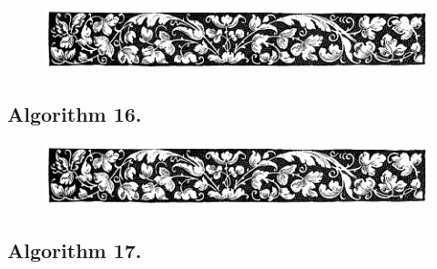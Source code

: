 \documentclass[preview]{standalone}
\begin{document}
\begin{figure}[!h]
    \centering
    \includegraphics[width=14cm]{../resources/jpg/3.1.algorithms/border2.jpg}
\end{figure}
\subsection[Partial sort.]{
    \color{section} Algorithm 16.
}

\vspace{1\baselineskip}
\begin{center}
    
\end{center}
\vspace{1\baselineskip}
\begin{center}
    
\end{center}


\begin{figure}[!h]
    \centering
    \includegraphics[width=14cm]{../resources/jpg/3.1.algorithms/border2.jpg}
\end{figure}
\subsection[Find the longest word.]{
    \color{section} Algorithm 17.
}

\vspace{1\baselineskip}
\begin{center}
    
\end{center}
\pagebreak
\begin{center}
    
\end{center}
\end{document}
